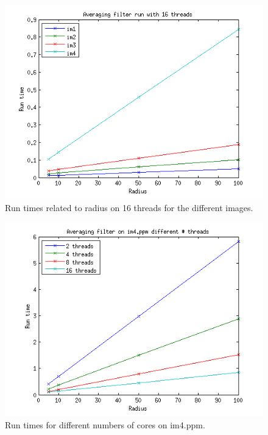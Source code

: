 \documentclass[a4paper,11pt]{article}
\begin{document}
\begin{figure}[!h]
  \caption{Run times related to radius on 16 threads for the different images.}
  \label{16_threads_runtime}
  \includegraphics[scale=0.9]{../plots/16_threads_runtime_radius.png}
\end{figure}
\begin{figure}[!h]
  \caption{Run times for different numbers of cores on im4.ppm.}
  \label{im4}
  \includegraphics[scale=0.9]{../plots/im4_pthread_runtime_radius.png}
\end{figure}
\end{document}
